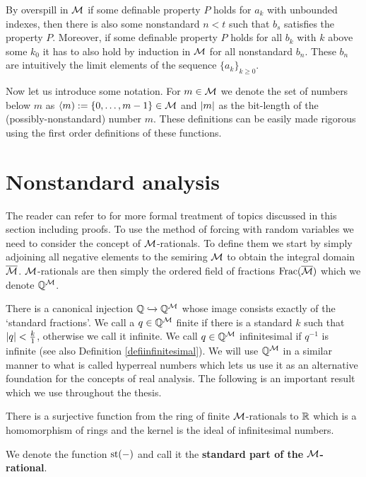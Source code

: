 By overspill in $\mathcal{M}$ if some definable property $P$ holds for $a_k$ with unbounded indexes, then there is also some nonstandard $n<t$ such that $b_s$ satisfies the property $P$. Moreover, if some definable property $P$ holds for all $b_k$ with $k$ above some $k_0$ it has to also hold by induction in $\mathcal{M}$ for all nonstandard $b_n$. These $b_n$ are intuitively the limit elements of the sequence $\{a_k\}_{k\geq0}$.

Now let us introduce some notation. For $m\in\mathcal{M}$ we denote the set of numbers below $m$ as $\langle m):=\{0,\dots,m-1\}\in\mathcal{M}$ and $\left|{m}\right|$ as the bit-length of the (possibly-nonstandard) number $m$. These definitions can be easily made rigorous using the first order definitions of these functions.

\section*{Nonstandard analysis}

The reader can refer to \cite{goldbring2014lecture} for more formal treatment of topics discussed in this section including proofs. To use the method of forcing with random variables we need to consider the concept of $\mathcal{M}$-rationals. To define them we start by simply adjoining all negative elements to the semiring $\mathcal{M}$ to obtain the integral domain $\overline {\mathcal{M}}$. $\mathcal{M}$-rationals are then simply the ordered field of fractions $\text{Frac}(\overline {\mathcal{M}})$ which we denote $\mathbb{Q}^{\mathcal{M}}$.

There is a canonical injection $\mathbb{Q} \xhookrightarrow{} \mathbb{Q}^{\mathcal{M}}$ whose image consists exactly of the `standard fractions'. We call a $q\in\mathbb{Q}^{\mathcal{M}}$ finite if there is a standard $k$ such that $\left|{q}\right|<\frac{k}{1}$, otherwise we call it infinite. We call $q\in\mathbb{Q}^{\mathcal{M}}$ infinitesimal if $q^{-1}$ is infinite (see also Definition \ref{defiinfinitesimal}). We will use $\mathbb{Q}^{\mathcal{M}}$ in a similar manner to what is called hyperreal numbers which lets us use it as an alternative foundation for the concepts of real analysis. The following is an important result which we use throughout the thesis.

\begin{thrm*}
There is a surjective function from the ring of finite $\mathcal{M}$-rationals to $\mathbb{R}$ which is a homomorphism of rings and the kernel is the ideal of infinitesimal numbers.

We denote the function $\text{st}(-)$ and call it the \textbf{standard part of the $\mathcal{M}$-rational}.
\end{thrm*}


